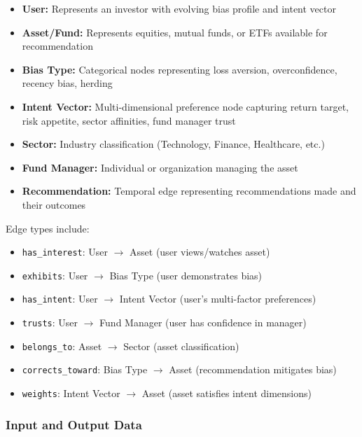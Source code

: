 \documentclass[12pt, a4paper]{article}
\begin{document}
\begin{itemize}[leftmargin=1.5cm]
  \item \textbf{User:} Represents an investor with evolving bias profile and intent vector
  \item \textbf{Asset/Fund:} Represents equities, mutual funds, or ETFs available for recommendation
  \item \textbf{Bias Type:} Categorical nodes representing loss aversion, overconfidence, recency bias, herding
  \item \textbf{Intent Vector:} Multi-dimensional preference node capturing return target, risk appetite, sector affinities, fund manager trust
  \item \textbf{Sector:} Industry classification (Technology, Finance, Healthcare, etc.)
  \item \textbf{Fund Manager:} Individual or organization managing the asset
  \item \textbf{Recommendation:} Temporal edge representing recommendations made and their outcomes
\end{itemize}

Edge types include:
\begin{itemize}[leftmargin=1.5cm]
  \item \texttt{has\_interest}: User $\to$ Asset (user views/watches asset)
  \item \texttt{exhibits}: User $\to$ Bias Type (user demonstrates bias)
  \item \texttt{has\_intent}: User $\to$ Intent Vector (user's multi-factor preferences)
  \item \texttt{trusts}: User $\to$ Fund Manager (user has confidence in manager)
  \item \texttt{belongs\_to}: Asset $\to$ Sector (asset classification)
  \item \texttt{corrects\_toward}: Bias Type $\to$ Asset (recommendation mitigates bias)
  \item \texttt{weights}: Intent Vector $\to$ Asset (asset satisfies intent dimensions)
\end{itemize}

\subsubsection{Input and Output Data}
\end{document}
